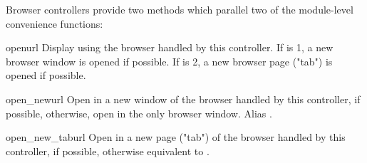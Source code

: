 Browser controllers provide two methods which parallel two of the
module-level convenience functions:

\begin{funcdesc}{open}{url}
  Display  using the browser handled by this controller.
  If  is 1, a new browser window is opened if possible.
  If  is 2, a new browser page ("tab") is opened if possible.
\end{funcdesc}

\begin{funcdesc}{open_new}{url}
  Open  in a new window of the browser handled by this
  controller, if possible, otherwise, open  in the only
  browser window.  Alias .
\end{funcdesc}

\begin{funcdesc}{open_new_tab}{url}
  Open  in a new page ("tab") of the browser handled by this
  controller, if possible, otherwise equivalent to .
\end{funcdesc}
